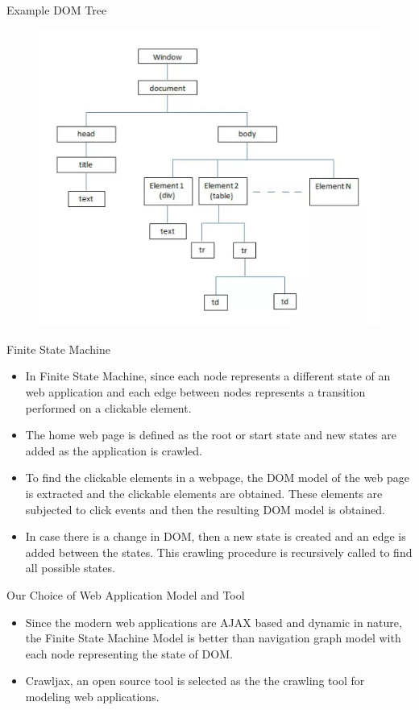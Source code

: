 \documentclass{beamer}
\begin{document}
\begin{frame}{Example DOM Tree}
 \begin{figure}[h]
    \centering
    \includegraphics[scale=0.6]{MTP3.png}
\end{figure}
\end{frame}


\begin{frame}{Finite State Machine}
 \begin{itemize}
     \item In Finite State Machine, since each node represents a different state of an web application and each edge between nodes represents a transition performed on a clickable element. 
     \item The home web page is defined as the root or start state and new states are added as the application is crawled. 
     \item To find the clickable elements in a webpage, the DOM model of the web page is extracted and the clickable elements are obtained. These elements are subjected to click events and then the resulting DOM model is obtained. 
    \item In case there is a change in DOM, then a new state is created and an edge is added between the states.  This crawling procedure is recursively called to find all possible states.
\end{itemize}    
\end{frame}


\begin{frame}{Our Choice of Web Application Model and Tool}

\begin{itemize}
        \item Since the modern web applications are AJAX based and dynamic in nature, the Finite State Machine Model is better than navigation graph model with each node representing the state of DOM. 
        \item Crawljax, an open source tool is selected as the the crawling tool for modeling web applications. 
    \end{itemize}
\end{frame}
\end{document}
